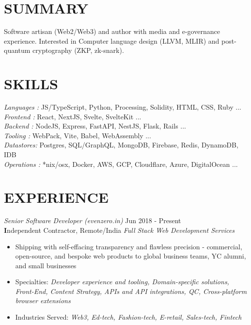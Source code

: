 \documentclass[margin, 10pt]{res} %
\begin{document}
\begin{resume}

\section{\ttfamily SUMMARY}  
Software artisan (Web2/Web3) and author with media and e-governance experience. Interested in Computer language design (LLVM, MLIR) and post-quantum cryptography (ZKP, zk-snark).

\section{\ttfamily SKILLS} 

{\sl Languages :} JS/TypeScript, Python, Processing, Solidity, HTML, CSS, Ruby ...\\
{\sl Frontend :} React, NextJS, Svelte, SvelteKit  ...\\
{\sl Backend :} NodeJS, Express, FastAPI, NestJS, Flask, Rails ...\\
{\sl Tooling :} WebPack, Vite, Babel, WebAssembly ... \\
{\sl Datastores:} Postgres, SQL/GraphQL, MongoDB, Firebase, Redis, DynamoDB, IDB\\
{\sl Operations :} *nix/osx, Docker, AWS, GCP, Cloudflare, Azure, DigitalOcean ...\\

\section{\ttfamily EXPERIENCE}

{\sl Senior Software Developer (evenzero.in)} \hfill Jun 2018 - \color{Green} Present\color{black}\\
\textbf Independent Contractor, Remote/India \hfill {\scriptsize \it Full Stack Web Development Services}
\begin{itemize}\smallskip\smallskip
\item Shipping with self-effacing transparency and flawless precision - commercial, open-source, and bespoke web products to global business teams, YC alumni, and small businesses
\item Specialties: {\sl Developer experience and tooling, Domain-specific solutions, Front-End, Content Strategy, APIs and API integrations, QC, Cross-platform browser extensions} 
\item Industries Served: {\sl Web3, Ed-tech, Fashion-tech, E-retail, Sales-tech, Fintech } 


\end{itemize}
\end{resume}
\end{document}
